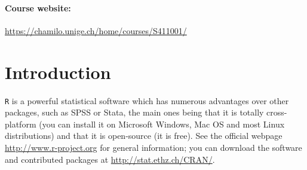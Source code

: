\documentclass[a4paper,12pt]{article}\usepackage[]{graphicx}\usepackage[]{color}
\begin{document}
%


\begin{center}
\bigskip

\bigskip

\bigskip

\bigskip

\bigskip

\bigskip


\bigskip

\bigskip

\bigskip
\end{center}


\paragraph{Course website:}

\url{https://chamilo.unige.ch/home/courses/S411001/}


\setlength{\parskip}{1ex plus 0.5ex minus 0.2ex}
\parindent=0cm
\setlength{\parskip}{1ex plus 0.5ex minus 0.2ex}
\linespread{1.1}
\sloppy

{\section{Introduction}}

\texttt{R} is a powerful statistical software which has numerous advantages over other packages, such as SPSS or Stata, the main ones being that it is totally cross-platform (you can install it on Microsoft Windows, Mac OS and most Linux distributions) and that it is open-source (it is free). See the official webpage \url{http://www.r-project.org} for general information; you can download the software and contributed packages at \url{http://stat.ethz.ch/CRAN/}. 
\end{document}
